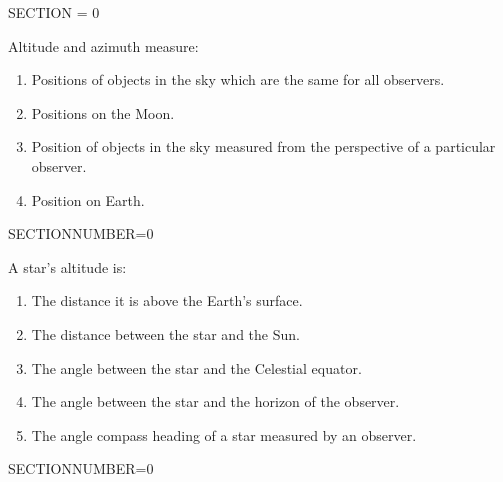 \documentclass[11pt]{article}
\begin{document}
\begin{enumerate}
\setlength{\itemsep}{1pt} 
\setlength{\parskip}{0pt} 
\setlength{\parsep}{0pt}
\setlength{\multicolsep}{1pt} 

\pagebreak 
\begin{minipage}{\textwidth} 
\begin{minipage}{\textwidth} 
\bigskip SECTION = 0
\end{minipage}
\end{minipage}
\begin{minipage}{\textwidth}
\begin{minipage}{\textwidth}
\item Altitude and azimuth measure:
\begin{enumerate} 
\setlength{\itemsep}{1pt} 
\setlength{\parskip}{0pt} 
\setlength{\parsep}{0pt}
\setlength{\multicolsep}{1pt} 
\item Positions of objects in the sky which are the same for all observers.
\item Positions on the Moon.
\item Position of objects in the sky measured from the perspective of a particular observer.
\item Position on Earth.
\end{enumerate} 
\end{minipage}
SECTIONNUMBER=0
\end{minipage}
\vskip 0.20in

\begin{minipage}{\textwidth}
\begin{minipage}{\textwidth}
\item A star's altitude is:
\begin{enumerate} 
\setlength{\itemsep}{1pt} 
\setlength{\parskip}{0pt} 
\setlength{\parsep}{0pt}
\setlength{\multicolsep}{1pt} 
\item The distance it is above the Earth's surface.
\item The distance between the star and the Sun.
\item The angle between the star and the Celestial equator.
\item The angle between the star and the horizon of the observer.
\item The angle compass heading of a star measured by an observer.
\end{enumerate} 
\end{minipage}
SECTIONNUMBER=0
\end{minipage}
\vskip 0.20in


\end{enumerate}
\end{document}
